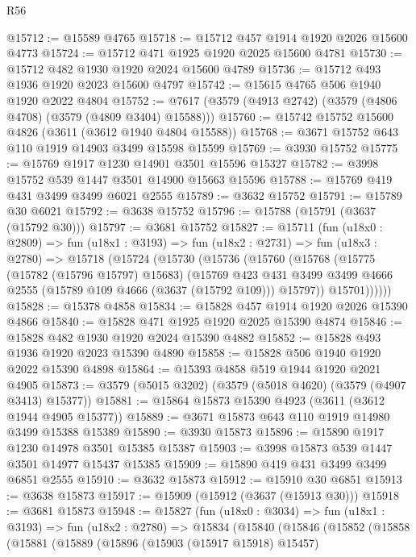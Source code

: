 \begin{lexlean}{R56}
\begin{coremodule}
@15712 := @15589 @4765
@15718 := @15712 @457 @1914 @1920 @2026 @15600 @4773
@15724 := @15712 @471 @1925 @1920 @2025 @15600 @4781
@15730 := @15712 @482 @1930 @1920 @2024 @15600 @4789
@15736 := @15712 @493 @1936 @1920 @2023 @15600 @4797
@15742 := @15615 @4765 @506 @1940 @1920 @2022 @4804
@15752 := @7617 (@3579 (@4913 @2742) (@3579 (@4806 @4708) (@3579 (@4809 @3404) @15588)))
@15760 := @15742 @15752 @15600 @4826 (@3611 (@3612 @1940 @4804 @15588))
@15768 := @3671 @15752 @643 @110 @1919 @14903 @3499 @15598 @15599
@15769 := @3930 @15752
@15775 := @15769 @1917 @1230 @14901 @3501 @15596 @15327
@15782 := @3998 @15752 @539 @1447 @3501 @14900 @15663 @15596
@15788 := @15769 @419 @431 @3499 @3499 @6021 @2555
@15789 := @3632 @15752
@15791 := @15789 @30 @6021
@15792 := @3638 @15752
@15796 := @15788 (@15791 (@3637 (@15792 @30)))
@15797 := @3681 @15752
@15827 := @15711
    (fun (u18x0 : @2809) =>
    fun (u18x1 : @3193) =>
    fun (u18x2 : @2731) =>
    fun (u18x3 : @2780) =>
    @15718
      (@15724
        (@15730
          (@15736
            (@15760
              (@15768
                (@15775
                  (@15782 (@15796 @15797) @15683)
                  (@15769
                    @423
                    @431
                    @3499
                    @3499
                    @4666
                    @2555
                    (@15789 @109 @4666 (@3637 (@15792 @109)))
                    @15797))
                @15701))))))
@15828 := @15378 @4858
@15834 := @15828 @457 @1914 @1920 @2026 @15390 @4866
@15840 := @15828 @471 @1925 @1920 @2025 @15390 @4874
@15846 := @15828 @482 @1930 @1920 @2024 @15390 @4882
@15852 := @15828 @493 @1936 @1920 @2023 @15390 @4890
@15858 := @15828 @506 @1940 @1920 @2022 @15390 @4898
@15864 := @15393 @4858 @519 @1944 @1920 @2021 @4905
@15873 := @3579 (@5015 @3202) (@3579 (@5018 @4620) (@3579 (@4907 @3413) @15377))
@15881 := @15864 @15873 @15390 @4923 (@3611 (@3612 @1944 @4905 @15377))
@15889 := @3671 @15873 @643 @110 @1919 @14980 @3499 @15388 @15389
@15890 := @3930 @15873
@15896 := @15890 @1917 @1230 @14978 @3501 @15385 @15387
@15903 := @3998 @15873 @539 @1447 @3501 @14977 @15437 @15385
@15909 := @15890 @419 @431 @3499 @3499 @6851 @2555
@15910 := @3632 @15873
@15912 := @15910 @30 @6851
@15913 := @3638 @15873
@15917 := @15909 (@15912 (@3637 (@15913 @30)))
@15918 := @3681 @15873
@15948 := @15827
    (fun (u18x0 : @3034) =>
    fun (u18x1 : @3193) =>
    fun (u18x2 : @2780) =>
    @15834
      (@15840
        (@15846
          (@15852
            (@15858
              (@15881
                (@15889
                  (@15896
                    (@15903 (@15917 @15918) @15457)

\end{coremodule}
\end{lexlean}
